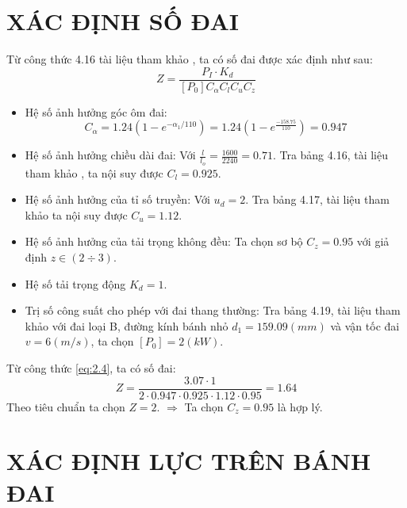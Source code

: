     \section{XÁC ĐỊNH SỐ ĐAI}
        \hspace*{0.6cm}Từ công thức 4.16 tài liệu tham khảo \cite{tltk1}, ta có số đai được xác định như sau:
        \begin{equation}
            Z = \frac{P_{I} \cdot K_{d}}{[P_{0}]C_{\alpha}C_{l}C_{u}C_{z}} 
            \label{eq:2.4}
        \end{equation}
        \begin{itemize}
            \item Hệ số ảnh hưởng góc ôm đai:
            $$ C_{\alpha} = 1.24(1 - e^{-\alpha_1/110}) = 1.24(1 - e^{\frac{-158.75}{110}}) = 0.947$$
            \item Hệ số ảnh hưởng chiều dài đai: Với $\frac{l}{l_o} = \frac{1600}{2240} = 0.71$. Tra bảng 4.16, tài liệu tham khảo \cite{tltk1}, ta nội suy được $C_{l} = 0.925$.
            \item Hệ số ảnh hưởng của tỉ số truyền: Với $u_d = 2$. Tra bảng 4.17, tài liệu tham khảo \cite{tltk1} ta nội suy được $C_{u} = 1.12$.
            \item Hệ số ảnh hưởng của tải trọng không đều: Ta chọn sơ bộ $C_z = 0.95$ với giả định $z \in (2 \div 3)$.
            \item Hệ số tải trọng động $K_d = 1$.
            \item Trị số công suất cho phép với đai thang thường: Tra bảng 4.19, tài liệu tham khảo \cite{tltk1} với đai loại B, đường kính bánh nhỏ $d_{1} = 159.09 (mm)$ và vận tốc đai $v = 6 (m/s)$, ta chọn $[P_{0}] = 2 (kW)$. 
        \end{itemize}
        \newpage
        Từ công thức \ref{eq:2.4}, ta có số đai: $$Z = \frac{3.07 \cdot 1}{2 \cdot 0.947 \cdot 0.925 \cdot 1.12 \cdot 0.95} = 1.64$$
        \hspace*{0.6cm}Theo tiêu chuẩn ta chọn $Z = 2$. $\Rightarrow$ Ta chọn $C_z = 0.95$ là hợp lý.
    \section{XÁC ĐỊNH LỰC TRÊN BÁNH ĐAI}

